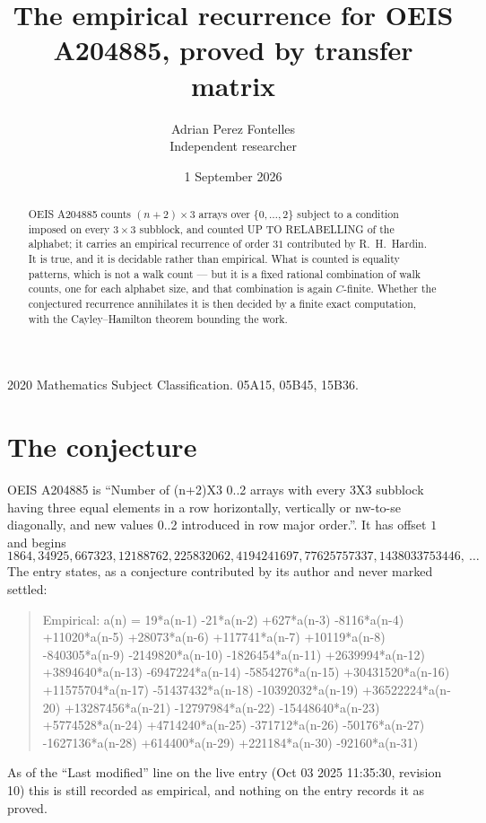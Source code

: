 \documentclass[11pt,a4paper]{article}
\title{The empirical recurrence for OEIS A204885, proved by transfer matrix}
\author{Adrian Perez Fontelles\\ \small Independent researcher}
\date{1 September 2026}
\theoremstyle{plain}
\theoremstyle{definition}
\begin{document}
\maketitle

\begin{abstract}
OEIS A204885 counts $(n+2)\times3$ arrays over $\{0,\dots,2\}$ subject to a condition imposed on
every $3\times3$ subblock, and counted UP TO RELABELLING of the
alphabet; it carries an empirical recurrence of order $31$ contributed by
R.~H.~Hardin. It is true, and it is decidable rather than empirical. What is counted is
equality patterns, which is not a walk count --- but it is a fixed rational combination of
walk counts, one for each alphabet size, and that combination is again $C$-finite. Whether the
conjectured recurrence annihilates it is then decided by a finite exact computation, with the
Cayley--Hamilton theorem bounding the work.
\end{abstract}

\noindent\small 2020 Mathematics Subject Classification. 05A15, 05B45, 15B36.\normalsize

\section{The conjecture}

OEIS A204885 is ``Number of (n+2)X3 0..2 arrays with every 3X3 subblock having three equal elements in a row horizontally, vertically or nw-to-se diagonally, and new values 0..2 introduced in row major order.''. It has offset $1$ and begins
\[
1864, 34925, 667323, 12188762, 225832062, 4194241697, 77625757337, 1438033753446,\ \dots
\]
The entry states, as a conjecture contributed by its author and never marked settled:
\begin{quote}
Empirical: a(n) = 19*a(n-1) -21*a(n-2) +627*a(n-3) -8116*a(n-4) +11020*a(n-5) +28073*a(n-6) +117741*a(n-7) +10119*a(n-8) -840305*a(n-9) -2149820*a(n-10) -1826454*a(n-11) +2639994*a(n-12) +3894640*a(n-13) -6947224*a(n-14) -5854276*a(n-15) +30431520*a(n-16) +11575704*a(n-17) -51437432*a(n-18) -10392032*a(n-19) +36522224*a(n-20) +13287456*a(n-21) -12797984*a(n-22) -15448640*a(n-23) +5774528*a(n-24) +4714240*a(n-25) -371712*a(n-26) -50176*a(n-27) -1627136*a(n-28) +614400*a(n-29) +221184*a(n-30) -92160*a(n-31)
\end{quote}
As of the ``Last modified'' line on the live entry (Oct 03 2025 11:35:30, revision 10) this is still
recorded as empirical, and nothing on the entry records it as proved.
\end{document}
